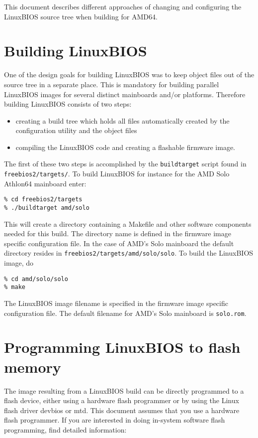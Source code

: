 \documentclass[titlepage,12pt]{article}
\begin{document}
This document describes different approaches of changing and configuring the
LinuxBIOS source tree when building for AMD64.

%
%

\section{Building LinuxBIOS}
One of the design goals for building LinuxBIOS was to keep object files
out of the source tree in a separate place. This is mandatory for
building parallel LinuxBIOS images for several distinct mainboards
and/or platforms. Therefore building LinuxBIOS consists of two steps:
\begin{itemize}
\item
creating a build tree which holds all files automatically created by the
configuration utility and the object files
\item
compiling the LinuxBIOS code and creating a flashable firmware image.
\end{itemize}

The first of these two steps is accomplished by the \texttt{buildtarget}
script found in \texttt{freebios2/targets/}. To build LinuxBIOS for
instance for the AMD Solo Athlon64 mainboard enter:

\begin{verbatim}
% cd freebios2/targets
% ./buildtarget amd/solo
\end{verbatim}

This will create a directory containing a Makefile and other software
components needed for this build. The directory name is defined in the
firmware image specific configuration file. In the case of AMD's Solo
mainboard the default directory resides in 
\texttt{freebios2/targets/amd/solo/solo}. To build the LinuxBIOS image, do

\begin{verbatim}
% cd amd/solo/solo
% make
\end{verbatim}

The LinuxBIOS image filename is specified in the firmware image specific
configuration file. The default filename for AMD's Solo mainboard is
\texttt{solo.rom}.

%
%

\section{Programming LinuxBIOS to flash memory}
The image resulting from a LinuxBIOS build can be directly programmed to
a flash device, either using a hardware flash programmer or by using the
Linux flash driver devbios or mtd. This document assumes that you use a
hardware flash programmer. If you are interested in doing in-system
software flash programming, find detailed information:
\end{document}
